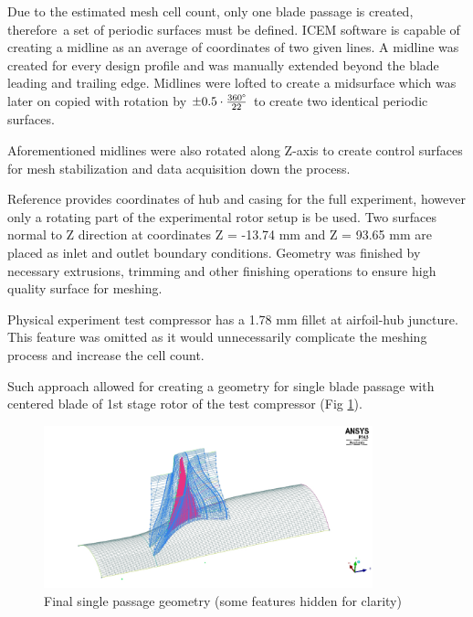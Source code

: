 Due to the estimated mesh cell count, only one blade passage is created, therefore~a set of periodic surfaces must be defined. ICEM software is capable of creating a midline as an average of coordinates of two given lines. A midline was created for every design profile and was manually extended beyond the blade leading and trailing edge. Midlines were lofted to create a midsurface which was later on copied with rotation by $\pm 0.5 \cdot \frac{360 \degree}{22}$ to create two identical periodic surfaces.

Aforementioned midlines were also rotated along Z-axis to create control surfaces for mesh stabilization and data acquisition down the process.

Reference \citep{r67laser} provides coordinates of hub and casing for the full experiment, however only a rotating part of the experimental rotor setup is be used. Two surfaces normal to Z direction at coordinates Z = -13.74 mm and Z = 93.65 mm are placed as inlet and outlet boundary conditions. Geometry was finished by necessary extrusions, trimming and other finishing operations to ensure high quality surface for meshing.

Physical experiment test compressor has a 1.78 mm fillet at airfoil-hub juncture. This feature was omitted as it would unnecessarily complicate the meshing process and increase the cell count.

Such approach allowed for creating a geometry for single blade passage with centered blade of 1st stage rotor of the test compressor (Fig \ref{geom_final}).

\begin{figure}[ht!]
\centering %
\includegraphics[width=0.85\textwidth]{Pictures/r67_geom.jpg}
\caption{Final single passage geometry (some features hidden for clarity)}
\label{geom_final}
\end{figure}

